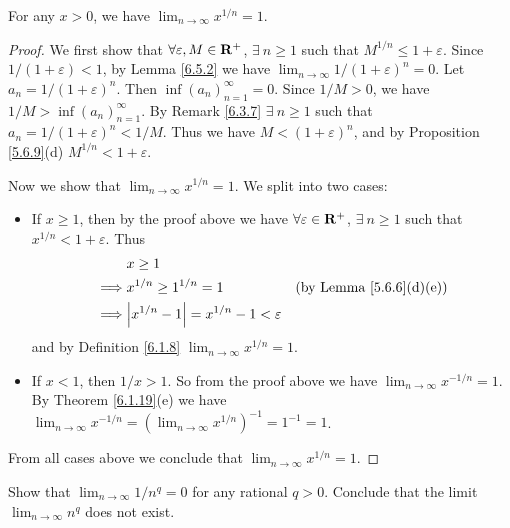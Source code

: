 \begin{lemma}\label{6.5.3}
    For any \(x > 0\), we have \(\lim_{n \to \infty} x^{1 / n} = 1\).
\end{lemma}

\begin{proof}
    We first show that \(\forall \varepsilon, M \in \mathbf{R}^+\), \(\exists\ n \geq 1\) such that \(M^{1 / n} \leq 1 + \varepsilon\).
    Since \(1 / (1 + \varepsilon) < 1\), by Lemma \ref{6.5.2} we have \(\lim_{n \to \infty} 1 / (1 + \varepsilon)^n = 0\).
    Let \(a_n = 1 / (1 + \varepsilon)^n\).
    Then \(\inf(a_n)_{n = 1}^\infty = 0\).
    Since \(1 / M > 0\), we have \(1 / M > \inf(a_n)_{n = 1}^\infty\).
    By Remark \ref{6.3.7} \(\exists\ n \geq 1\) such that \(a_n = 1 / (1 + \varepsilon)^n < 1 / M\).
    Thus we have \(M < (1 + \varepsilon)^n\), and by Proposition \ref{5.6.9}(d) \(M^{1 / n} < 1 + \varepsilon\).

    Now we show that \(\lim_{n \to \infty} x^{1 / n} = 1\).
    We split into two cases:
    \begin{itemize}
        \item If \(x \geq 1\), then by the proof above we have \(\forall \varepsilon \in \mathbf{R}^+\), \(\exists\ n \geq 1\) such that \(x^{1 / n} < 1 + \varepsilon\).
              Thus
              \begin{align*}
                           & x \geq 1                                                                                \\
                  \implies & x^{1 / n} \geq 1^{1 / n} = 1                      & \text{(by Lemma \ref{5.6.6}(d)(e))} \\
                  \implies & \abs{x^{1 / n} - 1} = x^{1 / n} - 1 < \varepsilon
              \end{align*}
              and by Definition \ref{6.1.8} \(\lim_{n \to \infty} x^{1 / n} = 1\).
        \item If \(x < 1\), then \(1 / x > 1\).
              So from the proof above we have \(\lim_{n \to \infty} x^{-1 / n} = 1\).
              By Theorem \ref{6.1.19}(e) we have \(\lim_{n \to \infty} x^{-1 / n} = (\lim_{n \to \infty} x^{1 / n})^{-1} = 1^{-1} = 1\).
    \end{itemize}
    From all cases above we conclude that \(\lim_{n \to \infty} x^{1 / n} = 1\).
\end{proof}

\exercisesection

\begin{exercise}\label{ex 6.5.1}
    Show that \(\lim_{n \to \infty} 1 / n^q = 0\) for any rational \(q > 0\).
    Conclude that the limit \(\lim_{n \to \infty} n^q\) does not exist.
\end{exercise}

